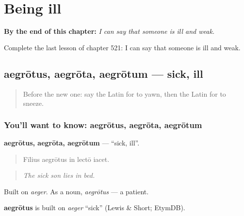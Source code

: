 
\chapter{Being ill}
\label{ch:la-being-ill}

\begin{chapteropening}
\textbf{By the end of this chapter:} \emph{I can say that someone is ill and weak.}

Complete the last lesson of chapter 521: I can say that someone is ill and weak.
\end{chapteropening}

\section[aegrōtus, aegrōta, aegrōtum]{aegrōtus, aegrōta, aegrōtum — sick, ill}

\label{lesson:LA-C521-aegrotus}



\begin{quote}
Before the new one: say the Latin for to yawn, then the Latin for to sneeze.
\end{quote}

\subsection*{You'll want to know: aegrōtus, aegrōta, aegrōtum}
\textbf{aegrōtus, aegrōta, aegrōtum} — \textquotedblleft{}sick, ill\textquotedblright{}.

\begin{quote}
Fīlius aegrōtus in lectō iacet.
\end{quote}

\begin{quote}
\emph{The sick son lies in bed.}
\end{quote}

Built on \emph{aeger}. As a noun, \emph{aegrōtus} — a patient.

\begin{cousinweb}
\textbf{aegrōtus} is built on \emph{aeger} \textquotedblleft{}sick\textquotedblright{} (Lewis \& Short; EtymDB).
\end{cousinweb}

